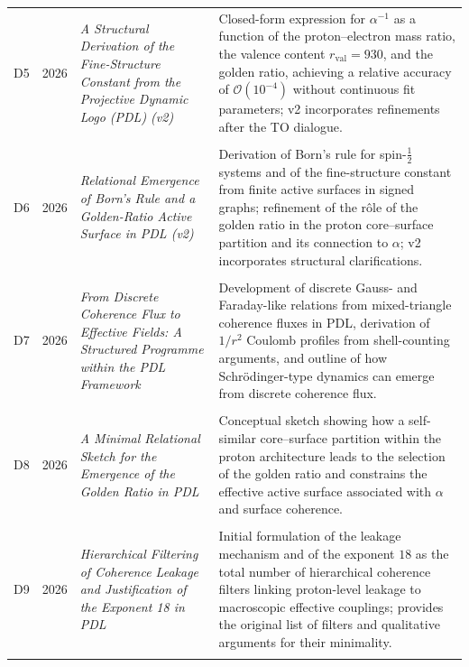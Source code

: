 \documentclass[11pt,a4paper]{article}
\begin{document}
\begin{longtable}{@{}llL{4cm}p{9.0cm}@{}}
D5 & 2026 & \textit{A Structural Derivation of the Fine-Structure Constant from the Projective Dynamic Logo (PDL) (v2)} &
Closed-form expression for $\alpha^{-1}$ as a function of the proton–electron mass ratio, the valence content $r_{\mathrm{val}}=930$, and the golden ratio, achieving a relative accuracy of $\mathcal{O}(10^{-4})$ without continuous fit parameters; v2 incorporates refinements after the TO dialogue. \citep{Alpha_PDL_v2_2026} \\\\[0.5em]

D6 & 2026 & \textit{Relational Emergence of Born's Rule and a Golden-Ratio Active Surface in PDL (v2)} &
Derivation of Born's rule for spin-$\tfrac{1}{2}$ systems and of the fine-structure constant from finite active surfaces in signed graphs; refinement of the rôle of the golden ratio in the proton core–surface partition and its connection to $\alpha$; v2 incorporates structural clarifications. \citep{Born_Golden_v2_2026,Golden_Ratio_Sketch_2026} \\\\[0.5em]

D7 & 2026 & \textit{From Discrete Coherence Flux to Effective Fields: A Structured Programme within the PDL Framework} &
Development of discrete Gauss- and Faraday-like relations from mixed-triangle coherence fluxes in PDL, derivation of $1/r^2$ Coulomb profiles from shell-counting arguments, and outline of how Schr\"odinger-type dynamics can emerge from discrete coherence flux. \citep{Effective_Fields_PDL_2026} \\\\[0.5em]

D8 & 2026 & \textit{A Minimal Relational Sketch for the Emergence of the Golden Ratio in PDL} &
Conceptual sketch showing how a self-similar core–surface partition within the proton architecture leads to the selection of the golden ratio and constrains the effective active surface associated with $\alpha$ and surface coherence. \citep{Golden_Ratio_Sketch_2026} \\\\[0.5em]

D9 & 2026 & \textit{Hierarchical Filtering of Coherence Leakage and Justification of the Exponent 18 in PDL} &
Initial formulation of the leakage mechanism and of the exponent $18$ as the total number of hierarchical coherence filters linking proton-level leakage to macroscopic effective couplings; provides the original list of filters and qualitative arguments for their minimality. \citep{Exponent_18_PDL_2026} \\\\[0.5em]


\end{longtable}
\end{document}
